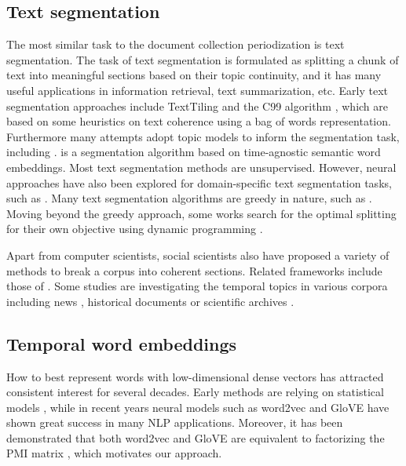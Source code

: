 \documentclass[output=paper]{langsci/langscibook}
\begin{document}
\subsection{Text segmentation}
The most similar task to the document collection periodization is text segmentation. The task of text segmentation is formulated as splitting a chunk of text into meaningful sections based on their topic continuity, and it has many useful applications in information retrieval, text summarization, etc. Early text segmentation approaches include TextTiling \citep{hearst1997texttiling} and the C99 algorithm \citep{choi2000advances}, which are based on some heuristics on text coherence using a bag of words representation. Furthermore many attempts adopt topic models to inform the segmentation task, including \citet{riedl2012text,du2013topic}. \citet{alemi2015text} is a segmentation algorithm based on time-agnostic semantic word embeddings. Most text segmentation methods are unsupervised. However, neural approaches have also been explored for domain-specific text segmentation tasks, such as \citet{sehikh2017topic}.
Many text segmentation algorithms are greedy in nature, such as \citet{choi2000advances,choi2001latent}. Moving beyond the greedy approach, some works search for the optimal splitting for their own objective using dynamic programming \citep{utiyama2001statistical,fragkou2004dynamic}. 

Apart from computer scientists, social scientists also have proposed a variety of methods to break a corpus into coherent sections. Related frameworks include those of \citet{ruef1999social,th2008identification,alsudais2016corpus}. Some studies are investigating the temporal topics in various corpora including news \citep{allan2001temporal}, historical documents \citep{duan2017discovering} or scientific archives \citep{blei2006dynamic,topicsovertime}.

\subsection{Temporal word embeddings}
How to best represent words with low-dimensional dense vectors has attracted consistent interest for several decades. Early methods are relying on statistical models \citep{lund1996producing,blei2003latent}, while in recent years neural models such as word2vec \citep{mikolov2013efficient} and GloVE \citep{pennington-etal-2014-glove} have shown great success in many NLP applications. Moreover, it has been demonstrated that both word2vec and GloVE are equivalent to factorizing the PMI matrix \citep{levy2014neural}, which motivates our approach.
\end{document}
